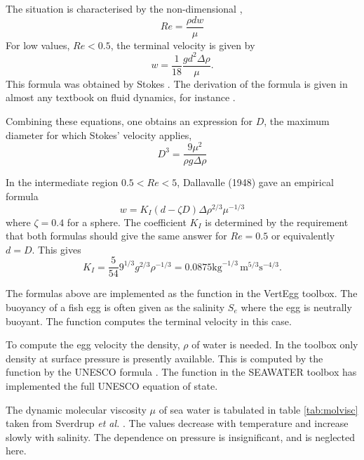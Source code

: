 The situation is characterised by the non-dimensional ,
\begin{equation}
  Re = \frac{\rho d w}{\mu}
\end{equation}
For low values, $Re < 0.5$, the terminal velocity is given by
\begin{equation}\label{eq:stokes}
  w = \frac{1}{18} \frac{g d^2 \Delta \rho}{\mu} .
\end{equation}
This formula was obtained by Stokes . The
derivation of the formula is given in almost any textbook on
fluid dynamics, for instance \citep{yih77}.


Combining these equations, one obtains an expression for $D$, the maximum
diameter for which Stokes' velocity applies,
\begin{equation}
  D^3 = \frac{9 \mu^2}{\rho g \Delta \rho}
\end{equation}


In the intermediate region $0.5 < Re < 5$, Dallavalle (1948) gave an
empirical formula
\begin{equation}\label{eq:dallavalle}
  w = K_I (d - \zeta D) \Delta \rho^{2/3} \mu^{-1/3}
\end{equation}
where $\zeta = 0.4$ for a sphere. The coefficient $K_I$ is determined
by the requirement that both formulas should give the same answer for
$Re = 0.5$ or equivalently $d = D$.
This gives
\begin{equation}
  K_I = \frac{5}{54} 9^{1/3} g^{2/3} \rho^{-1/3}
         = 0.0875 \text{kg}^{-1/3} \,
             \text{m}^{5/3} \text{s}^{-4/3} .
\end{equation}

The formulas above are implemented as the function  in
the VertEgg toolbox. The buoyancy of a fish egg is often given as the
salinity $S_e$ where the egg is neutrally buoyant. The function
 computes the terminal velocity in this case.


To compute the egg velocity the density, $\rho$ of water is needed.
In the toolbox only density at surface pressure is presently
available.  This is computed by the function  by the
UNESCO formula \citep{UNES81}.  The function  in the
SEAWATER toolbox \citep{morg94} has implemented the
full UNESCO equation of state.

The dynamic molecular
viscosity $\mu$ of
sea water is tabulated in table \ref{tab:molvisc} taken from Sverdrup
\emph{et al.}
. The values decrease  with temperature and increase
slowly with salinity. The dependence on pressure is insignificant, and is
neglected here.

